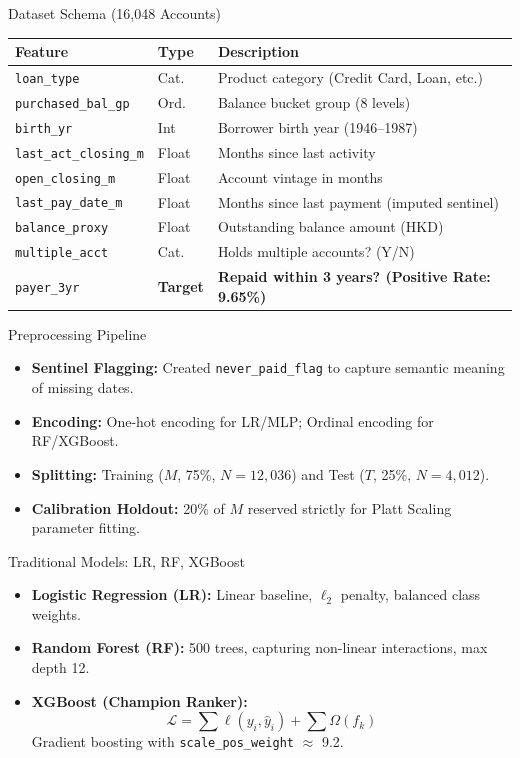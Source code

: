 \documentclass[10pt]{beamer}
\begin{document}
\begin{frame}{\textrm{Dataset Schema (16,048 Accounts)}}
\centering
\scriptsize
\begin{tabular}{@{}llp{5.5cm}@{}}
\toprule
\textbf{Feature} & \textbf{Type} & \textbf{Description}\\
\midrule
\texttt{loan\_type} & Cat. & Product category (Credit Card, Loan, etc.)\\
\texttt{purchased\_bal\_gp} & Ord. & Balance bucket group (8 levels)\\
\texttt{birth\_yr} & Int & Borrower birth year (1946--1987)\\
\texttt{last\_act\_closing\_m} & Float & Months since last activity\\
\texttt{open\_closing\_m} & Float & Account vintage in months\\
\texttt{last\_pay\_date\_m} & Float & Months since last payment (imputed sentinel)\\
\texttt{balance\_proxy} & Float & Outstanding balance amount (HKD)\\
\texttt{multiple\_acct} & Cat. & Holds multiple accounts? (Y/N)\\
\midrule
\texttt{payer\_3yr} & \textbf{Target} & \textbf{Repaid within 3 years? (Positive Rate: 9.65\%)}\\
\bottomrule
\end{tabular}
\end{frame}

\begin{frame}{\textrm{Preprocessing Pipeline}}
    \begin{itemize}
        \item \textbf{Sentinel Flagging:} Created \texttt{never\_paid\_flag} to capture semantic meaning of missing dates.
        \item \textbf{Encoding:} One-hot encoding for LR/MLP; Ordinal encoding for RF/XGBoost.
        \item \textbf{Splitting:} Training ($M$, 75\%, $N=12{,}036$) and Test ($T$, 25\%, $N=4{,}012$).
        \item \textbf{Calibration Holdout:} 20\% of $M$ reserved strictly for Platt Scaling parameter fitting.
    \end{itemize}
\end{frame}

\begin{frame}{\textrm{Traditional Models: LR, RF, XGBoost}}
    \begin{itemize}
        \item \textbf{Logistic Regression (LR):} Linear baseline, $\ell_2$ penalty, balanced class weights.
        \item \textbf{Random Forest (RF):} 500 trees, capturing non-linear interactions, max depth 12.
        \item \textbf{XGBoost (Champion Ranker):} 
        \[ \mathcal{L} = \sum \ell(y_i, \hat{y}_i) + \sum \Omega(f_k) \]
        Gradient boosting with \texttt{scale\_pos\_weight} $\approx$ 9.2.
    \end{itemize}
\end{frame}
\end{document}
